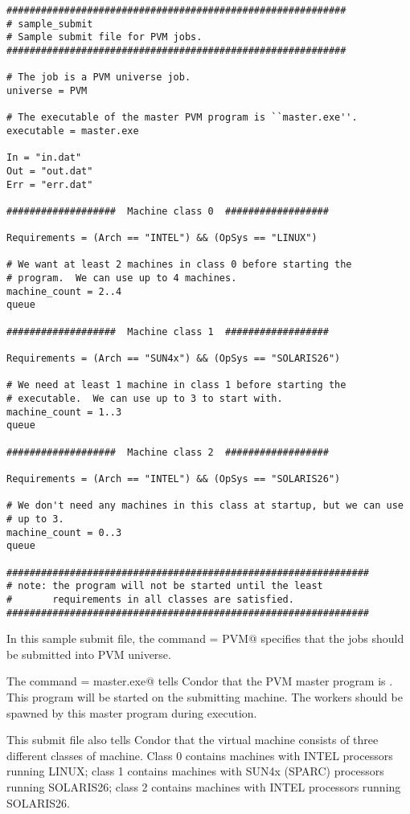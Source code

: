 \CondorSmall
\begin{verbatim}
###########################################################
# sample_submit
# Sample submit file for PVM jobs. 
###########################################################

# The job is a PVM universe job.
universe = PVM  

# The executable of the master PVM program is ``master.exe''.
executable = master.exe

In = "in.dat"
Out = "out.dat"
Err = "err.dat"

###################  Machine class 0  ##################

Requirements = (Arch == "INTEL") && (OpSys == "LINUX") 

# We want at least 2 machines in class 0 before starting the 
# program.  We can use up to 4 machines.
machine_count = 2..4  
queue

###################  Machine class 1  ##################

Requirements = (Arch == "SUN4x") && (OpSys == "SOLARIS26") 

# We need at least 1 machine in class 1 before starting the 
# executable.  We can use up to 3 to start with.
machine_count = 1..3
queue

###################  Machine class 2  ##################

Requirements = (Arch == "INTEL") && (OpSys == "SOLARIS26") 

# We don't need any machines in this class at startup, but we can use
# up to 3. 
machine_count = 0..3
queue

###############################################################
# note: the program will not be started until the least 
#       requirements in all classes are satisfied.
###############################################################
\end{verbatim}
\normalsize

In this sample submit file, the command \verb@universe = PVM@
specifies that the jobs should be submitted into PVM universe.

The command \verb@executable = master.exe@ tells Condor that the PVM
master program is .  This program will be started on
the submitting machine.  The workers should be spawned by this master
program during execution.

This submit file also tells Condor that the virtual machine
consists of three different classes of machine.  Class
0 contains machines with INTEL processors running LINUX; class
1 contains machines with SUN4x (SPARC) processors running SOLARIS26;
class 2 contains machines with INTEL processors running SOLARIS26.

